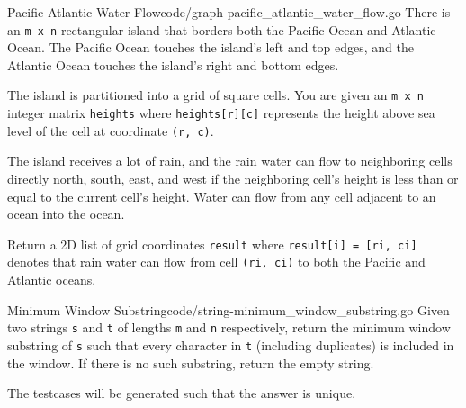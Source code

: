 \documentclass[10pt]{report}
\newcommand{\var}[1]{\texttt{#1}}
\newcommand\blankpage{%
    \clearpage
    \null
    \thispagestyle{empty}%
    \clearpage
}
\begin{document}
\begin{problem}{Pacific Atlantic Water Flow}{code/graph-pacific_atlantic_water_flow.go}
There is an \var{m x n} rectangular island that borders both the Pacific Ocean and Atlantic Ocean. The Pacific Ocean touches the island's left and top edges, and the Atlantic Ocean touches the island's right and bottom edges.

The island is partitioned into a grid of square cells. You are given an \var{m x n} integer matrix \var{heights} where \var{heights[r][c]} represents the height above sea level of the cell at coordinate \var{(r, c)}.

The island receives a lot of rain, and the rain water can flow to neighboring cells directly north, south, east, and west if the neighboring cell's height is less than or equal to the current cell's height. Water can flow from any cell adjacent to an ocean into the ocean.

Return a 2D list of grid coordinates \var{result} where \var{result[i] = [ri, ci]} denotes that rain water can flow from cell \var{(ri, ci)} to both the Pacific and Atlantic oceans.    
\end{problem}

\begin{problem}{Minimum Window Substring}{code/string-minimum_window_substring.go}
Given two strings \var{s} and \var{t} of lengths \var{m} and \var{n} respectively, return the minimum window substring of \var{s} such that every character in \var{t} (including duplicates) is included in the window. If there is no such substring, return the empty string.

The testcases will be generated such that the answer is unique.
\end{problem}

\blankpage


\tableofcontents
\blankpage
\end{document}

